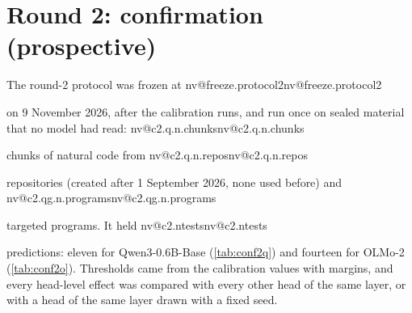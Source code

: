 \documentclass[11pt]{article}
\makeatletter
\newcommand{\nv}[1]{\ifcsname nv@#1\endcsname\csname nv@#1\endcsname\else\PackageError{numbers}{Unknown number key #1}{}\fi}
\newcommand{\qw}{Qwen3-0.6B-Base}
\makeatother
\begin{document}
\section{Round 2: confirmation (prospective)}
\label{sec:r2conf}

The round-2 protocol was frozen at \nv{freeze.protocol2} on 9 November 2026, after the calibration runs, and run once on sealed material that no model had read: \nv{c2.q.n.chunks} chunks of natural code from \nv{c2.q.n.repos} repositories (created after 1 September 2026, none used before) and \nv{c2.qg.n.programs} targeted programs. It held \nv{c2.ntests} predictions: eleven for \qw{} (\cref{tab:conf2q}) and fourteen for OLMo-2 (\cref{tab:conf2o}). Thresholds came from the calibration values with margins, and every head-level effect was compared with every other head of the same layer, or with a head of the same layer drawn with a fixed seed.
\end{document}
